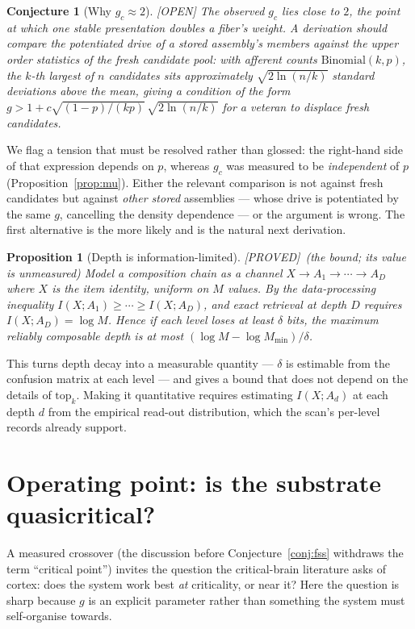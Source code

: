 \documentclass[11pt]{article}
\theoremstyle{definition}
\theoremstyle{plain}
\newtheorem{proposition}[lemma]{Proposition}
\newtheorem{conjecture}[lemma]{Conjecture}
\newcommand{\PROVED}{\textnormal{\footnotesize\textsf{[PROVED]}}}
\newcommand{\OPEN}{\textnormal{\footnotesize\textsf{[OPEN]}}}
\newcommand{\wta}{\mathrm{top}_k}
\begin{document}
\begin{conjecture}[Why $g_c \approx 2$]\label{conj:why} \OPEN
The observed $g_c$ lies close to $2$, the point at which one stable
presentation doubles a fiber's weight. A derivation should compare the
potentiated drive of a stored assembly's members against the upper order
statistics of the fresh candidate pool: with afferent counts
$\mathrm{Binomial}(k,p)$, the $k$-th largest of $n$ candidates sits
approximately $\sqrt{2\ln(n/k)}$ standard deviations above the mean, giving a
condition of the form $g > 1 + c\sqrt{(1-p)/(kp)}\,\sqrt{2\ln(n/k)}$ for a
veteran to displace fresh candidates.
\end{conjecture}

We flag a tension that must be resolved rather than glossed: the right-hand
side of that expression depends on $p$, whereas $g_c$ was measured to be
\emph{independent} of $p$ (Proposition~\ref{prop:mu}). Either the relevant
comparison is not against fresh candidates but against \emph{other stored}
assemblies --- whose drive is potentiated by the same $g$, cancelling the
density dependence --- or the argument is wrong. The first alternative is the
more likely and is the natural next derivation.

\begin{proposition}[Depth is information-limited]\label{prop:dpi} \PROVED\ (the bound; its value is unmeasured)
Model a composition chain as a channel $X \to A_1 \to \cdots \to A_D$ where
$X$ is the item identity, uniform on $M$ values. By the data-processing
inequality $I(X; A_1) \ge \cdots \ge I(X; A_D)$, and exact retrieval at depth
$D$ requires $I(X;A_D) = \log M$. Hence if each level loses at least $\delta$
bits, the maximum reliably composable depth is at most
$(\log M - \log M_{\min})/\delta$.
\end{proposition}

This turns depth decay into a measurable quantity --- $\delta$ is estimable
from the confusion matrix at each level --- and gives a bound that does not
depend on the details of $\wta$. Making it quantitative requires estimating
$I(X;A_d)$ at each depth $d$ from the empirical read-out distribution, which the scan's per-level
records already support.

\section{Operating point: is the substrate quasicritical?}

A measured crossover (the discussion before Conjecture~\ref{conj:fss} withdraws the term ``critical point'') invites the question the critical-brain literature
asks of cortex: does the system work best \emph{at} criticality, or near it?
Here the question is sharp because $g$ is an explicit parameter rather than
something the system must self-organise towards.
\end{document}
